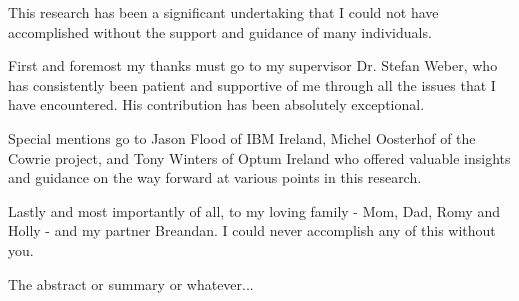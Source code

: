 \documentclass[a4paper, 12pt, oneside]{report}
\begin{document}

\thesistitlepage                            %

\thesisdeclarationpage				  		%

\thesispermissionpage				  		%


\begin{thesisacknowledgments}               %
This research has been a significant undertaking that I could not have accomplished without the support and guidance of many individuals. 

First and foremost my thanks must go to my supervisor Dr. Stefan Weber, who has consistently been patient and supportive of me through all the issues that I have encountered. His contribution has been absolutely exceptional.

Special mentions go to Jason Flood of IBM Ireland, Michel Oosterhof of the Cowrie project, and Tony Winters of Optum Ireland who offered valuable insights and guidance on the way forward at various points in this research.

Lastly and most importantly of all, to my loving family - Mom, Dad, Romy and Holly - and my partner Breandan. I could never accomplish any of this without you.

\end{thesisacknowledgments}                 %

\begin{thesisabstract}

The abstract or summary or whatever...

\end{thesisabstract}

\tableofcontents                            %
\listoftables                               %
\listoffigures                              %

                                
                                





\end{document}
